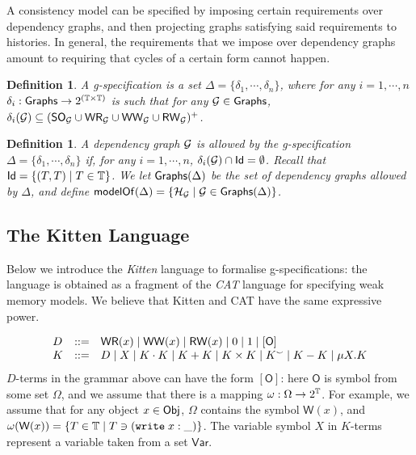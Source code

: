 \documentclass[a4paper,UKenglish]{article}%
\newif\ifdraft
\newcommand{\ac}[1]{\ifdraft{}{\color{blue}#1}\else{}\fi}
\newtheorem{definition}[theorem]{Definition}
\theoremstyle{plain}
\begin{document}
A consistency model can be specified by imposing certain requirements 
over dependency graphs, and then projecting graphs satisfying said 
requirements to histories. In general, the requirements that we 
impose over dependency graphs amount to requiring that cycles 
of a certain form cannot happen. 

\begin{definition}
A g-specification is a set $\Delta = \{\delta_1, \cdots, \delta_n\}$, 
where for any $i=1,\cdots, n$ $\delta_i : \mathsf{Graphs} \rightarrow 2^{(\mathbb{T} \times \mathbb{T})}$ 
is such that for any $\mathcal{G} \in \mathsf{Graphs}$, $\delta_i(\mathcal{G}) \subseteq ({\sf{SO}}_{\mathcal{G}} \cup {\mathsf{WR}}_{\mathcal{G}} \cup {\mathsf{WW}}_{\mathcal{G}} \cup {\mathsf{RW}}_{\mathcal{G}})^{+}$.
\ac{Need to decide, it could be that I may want to admit also $\RF_{\G}^{-1}, \VO_{\G}^{-1}$ and $\AD_{\G}^{-1}$ 
as edges.}
\end{definition}

\begin{definition}
A dependency graph $\mathcal{G}$ is allowed by the g-specification $\Delta = \{\delta_1, \cdots, \delta_n\}$ if, 
for any $i=1,\cdots,n$, $\delta_i(\mathcal{G}) \cap \mathsf{Id} = \emptyset$. Recall that $\mathsf{Id} = \{(T, T) \mid T \in \mathbb{T}\}$.
We let $\mathsf{Graphs}(\Delta)$ be the set of dependency graphs allowed by $\Delta$, and define $\mathsf{modelOf}(\Delta) = 
\{\mathcal{H}_{\mathcal{G}} \mid \mathcal{G} \in \mathsf{Graphs}(\Delta) \}$.
\end{definition}

\subsection{The Kitten Language}
Below we introduce the \emph{Kitten} language to formalise g-specifications: the language 
is obtained as a fragment of the \emph{CAT} language for specifying weak 
memory models. We believe that Kitten and CAT have the same expressive power. 

\[
\begin{array}{lcl}
D &::=& {\mathsf{WR}}(x) \;\lvert\; {\mathsf{WW}}(x) \;\lvert\; {\mathsf{RW}}(x) \;\lvert\; 0 \;\lvert\; 1\;\lvert\; [\mathsf{O}]\\
K &::=& D \;\lvert\; X \;\lvert\; K \cdot K \;\lvert\; K + K \;\lvert\; K \times K \;\lvert\; K^{\smallsmile} \;\lvert\; K - K \;\lvert \; \mu X. K
\end{array}
\]
$D$-terms in the grammar above can have the form $[\mathsf{O}]$: here $\mathsf{O}$ is symbol from some set $\Omega$, and 
we assume that there is a mapping $\omega: \Omega \rightarrow 2^{\mathbb{T}}$. For example, we assume that for any 
object $x \in \mathsf{Obj}$, $\Omega$ contains the symbol $\mathsf{W}(x)$, and $\omega(\mathsf{W}(x)) = \{T \in \mathbb{T} \mid T \ni ({{\tt write}}\;x:\_)\}$.
The variable symbol $X$ in $K$-terms represent a variable taken from a set $\mathsf{Var}$.
\end{document}
